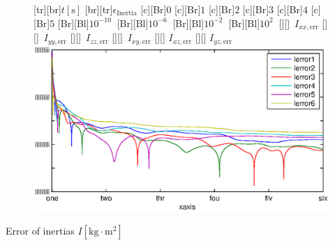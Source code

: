\documentclass[student,noshadow]{ITRslides}
\newcommand{\scr}[1]{\mathrm{#1}}
\begin{document}
\begin{frame}
\begin{columns}
		\begin{column}{0.5\textwidth}
			\centering
			\begin{figure}
				[tr][br]{$t\left[\mathrm{s}\right]$}
				[br][tr]{$\epsilon_{\scr{Inertia}}$}
				[c][Br]{$0$}
				[c][Br]{$1$}
				[c][Br]{$2$}
				[c][Br]{$3$}
				[c][Br]{$4$}
				[c][Br]{$5$}
				[Br][Bl]{$10^{-10}\  $}
				[Br][Bl]{$10^{-6}\  $}
				[Br][Bl]{$10^{-2}\  $}
				[Br][Bl]{$10^2\  $}
				[][]{\tiny \  $I_{xx,\scr{err}}$}
				[][]{\tiny \  $I_{yy,\scr{err}}$}
				[][]{\tiny \  $I_{zz,\scr{err}}$}
				[][]{\tiny \  $I_{xy,\scr{err}}$}
				[][]{\tiny \hspace{0.5cm} $I_{xz,\scr{err}}$}
				[][]{\tiny \hspace{0.5cm} $I_{yz,\scr{err}}$}
				\includegraphics[width=\textwidth]{fig/inertia_multi.eps}
				\label{fig:estim_inertia_multi}
			\end{figure}
			Error of inertias $I \left[\mathrm{kg} \cdot \mathrm{m}^2\right]$
		\end{column}
	\end{columns}
\end{frame}
\end{document}
